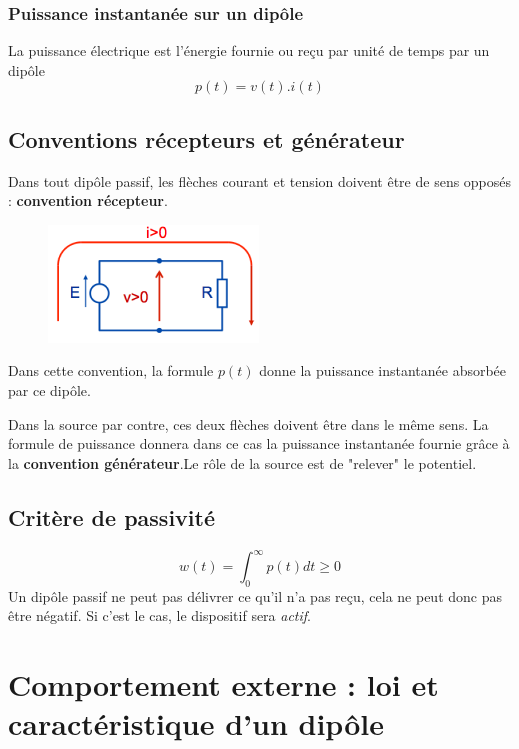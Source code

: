 \documentclass	[11pt, a4paper, openany]{book}
\begin{document}
\subsubsection{Puissance instantanée sur un dipôle}
La puissance électrique est l'énergie fournie ou reçu par unité de temps par un dipôle
\begin{equation}
p(t) = v(t).i(t)
\end{equation}

\subsection{Conventions récepteurs et générateur}
Dans tout dipôle passif, les flèches courant et tension doivent être de sens opposés : \textbf{convention récepteur}.\\
\begin{figure}
\includegraphics[scale=0.5]{img/image5.png}
\end{figure} Dans cette convention, la formule $p(t)$ donne la puissance instantanée absorbée par ce dipôle.

Dans la source par contre, ces deux flèches doivent être dans le même sens. La formule de puissance donnera dans ce cas la puissance instantanée fournie grâce à la \textbf{convention générateur}.Le rôle de la source est de "relever" le potentiel.

\subsection{Critère de passivité}
\begin{equation}
w(t) = \int_0^\infty p(t)dt \geq 0
\end{equation}
Un dipôle passif ne peut pas délivrer ce qu'il n'a pas reçu, cela ne peut donc pas être négatif. Si c'est le cas, le dispositif sera \textit{actif}.
 


\newpage
\section{Comportement externe : loi et caractéristique d'un dipôle}
\end{document}
